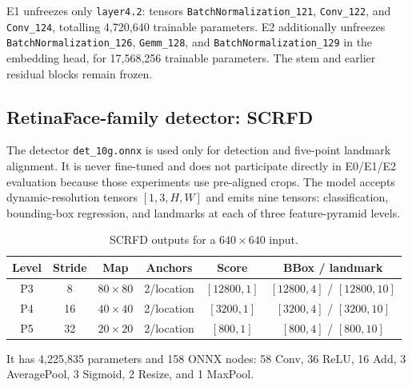 \documentclass[11pt,a4paper]{article}
\newcommand{\code}[1]{\texttt{#1}}
\begin{document}
E1 unfreezes only \code{layer4.2}: tensors \code{BatchNormalization\_121}, \code{Conv\_122}, and \code{Conv\_124}, totalling 4,720,640 trainable parameters. E2 additionally unfreezes \code{BatchNormalization\_126}, \code{Gemm\_128}, and \code{BatchNormalization\_129} in the embedding head, for 17,568,256 trainable parameters. The stem and earlier residual blocks remain frozen.

\subsection{RetinaFace-family detector: SCRFD}

The detector \code{det\_10g.onnx} is used only for detection and five-point landmark alignment. It is never fine-tuned and does not participate directly in E0/E1/E2 evaluation because those experiments use pre-aligned crops. The model accepts dynamic-resolution tensors $[1,3,H,W]$ and emits nine tensors: classification, bounding-box regression, and landmarks at each of three feature-pyramid levels.

\begin{table}[H]
\centering
\caption{SCRFD outputs for a $640\times640$ input.}
\begin{tabular}{cccccc}
\toprule
\textbf{Level} & \textbf{Stride} & \textbf{Map} & \textbf{Anchors} & \textbf{Score} & \textbf{BBox / landmark}\\
\midrule
P3 & 8  & $80\times80$ & 2/location & $[12800,1]$ & $[12800,4]$ / $[12800,10]$\\
P4 & 16 & $40\times40$ & 2/location & $[3200,1]$  & $[3200,4]$ / $[3200,10]$\\
P5 & 32 & $20\times20$ & 2/location & $[800,1]$   & $[800,4]$ / $[800,10]$\\
\bottomrule
\end{tabular}
\end{table}

It has 4,225,835 parameters and 158 ONNX nodes: 58 Conv, 36 ReLU, 16 Add, 3 AveragePool, 3 Sigmoid, 2 Resize, and 1 MaxPool.
\end{document}
